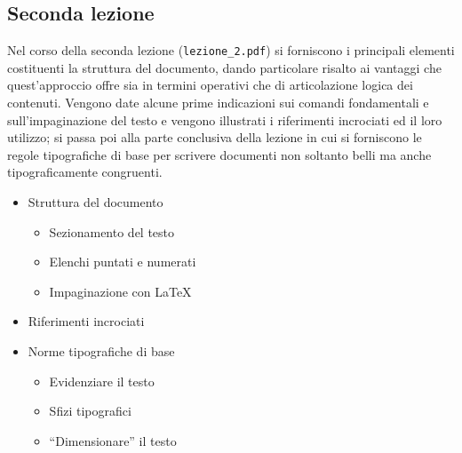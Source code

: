 \documentclass[a4paper,12pt]{article}
\begin{document}
\subsection{Seconda lezione}
Nel corso della seconda lezione (\texttt{lezione\_2.pdf}) si
forniscono i principali elementi costituenti la struttura del
documento, dando particolare risalto ai vantaggi che quest'approccio
offre sia in termini operativi che di articolazione logica dei
contenuti. Vengono date alcune prime indicazioni sui comandi
fondamentali e sull'impaginazione del testo e vengono illustrati i
riferimenti incrociati ed il loro utilizzo; si passa poi
alla parte conclusiva della lezione in cui si forniscono le regole
tipografiche di base per scrivere documenti non soltanto belli ma
anche tipograficamente congruenti.
	\begin{itemize}
	\item Struttura del documento
		\begin{itemize}
	\item Sezionamento del testo
		\item Elenchi puntati e numerati
		\item Impaginazione con \LaTeX
		\end{itemize}
	\item Riferimenti incrociati
	\item Norme tipografiche di base
		\begin{itemize}
		\item Evidenziare il testo
		\item Sfizi tipografici
		\item ``Dimensionare'' il testo
		\end{itemize}
	\end{itemize}
\end{document}
